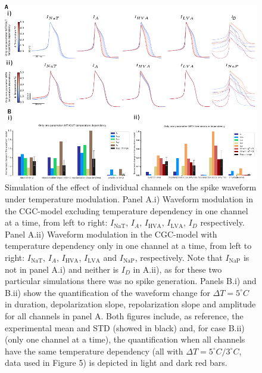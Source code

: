 \begin{figure}[htb!]
	\includegraphics[width=\textwidth]{img/laser/FigureS2.pdf}
	\caption{Simulation of the effect of individual channels on the spike waveform under temperature modulation. Panel A.i) Waveform modulation in the CGC-model excluding temperature dependency in one channel at a time, from left to right: $I_{\textrm{NaT}}$, $I_{A}$, $I_{\textrm{HVA}}$, $I_{\textrm{LVA}}$, $I_{D}$ respectively. Panel A.ii) Waveform modulation in the CGC-model with temperature dependency only in one channel at a time, from left to right: $I_{\textrm{NaT}}$, $I_{A}$, $I_{\textrm{HVA}}$, $I_{\textrm{LVA}}$ and $I_{\textrm{NaP}}$, respectively. Note that  $I_{\textrm{NaP}}$ is not in panel A.i) and neither is $I_{D}$ in A.ii), as for these two particular simulations there was no spike generation. Panels B.i) and B.ii) show the quantification of the waveform change for $\Delta T=5^{\circ}C$ in duration, depolarization slope, repolarization slope and amplitude for all channels in panel A. Both figures include, as reference, the experimental mean and STD (showed in black) and, for case B.ii) (only one channel at a time), the quantification when all channels have the same temperature dependency (all with $\Delta T=5^{\circ}C / 3^{\circ}C$, data used in Figure 5) is depicted in light and dark red bars.}
	\label{fig:temperature simulation include exclude}
	
\end{figure}


